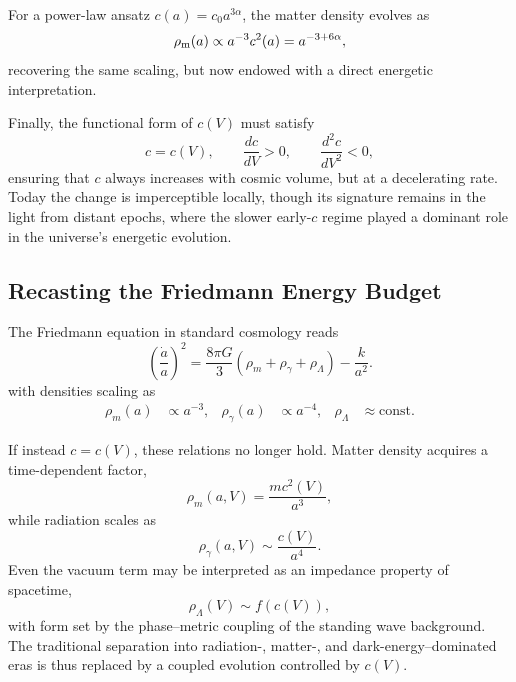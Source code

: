 \documentclass[12pt]{article}
\begin{document}
For a power-law ansatz $c(a) = c_0 a^{3\alpha}$, the matter density evolves as
\begin{equation}
\rho_{\rm m}(a) \propto a^{-3} c^2(a) = a^{-3 + 6\alpha},
\end{equation}
recovering the same scaling, but now endowed with a direct energetic interpretation.

Finally, the functional form of \(c(V)\) must satisfy
\begin{equation}
  c = c(V), \qquad \frac{dc}{dV} > 0, \qquad \frac{d^2c}{dV^2} < 0,
\end{equation}
ensuring that \(c\) always increases with cosmic volume, but at a decelerating rate. Today the change is imperceptible locally, though its signature remains in the light from distant epochs, where the slower early-\(c\) regime played a dominant role in the universe’s energetic evolution.

\subsection{Recasting the Friedmann Energy Budget}

The Friedmann equation in standard cosmology reads
\begin{equation}
\left(\frac{\dot{a}}{a}\right)^{2} = \frac{8 \pi G}{3} \left( \rho_{m} + \rho_{\gamma} + \rho_{\Lambda} \right) - \frac{k}{a^{2}} .
\end{equation}
with densities scaling as
\begin{align}
\rho_{m}(a) &\propto a^{-3}, &
\rho_{\gamma}(a) &\propto a^{-4}, &
\rho_{\Lambda} &\approx \text{const}.
\end{align}

If instead $c = c(V)$, these relations no longer hold. Matter density acquires a time-dependent factor,
\begin{equation}
\rho_{m}(a, V) = \frac{m c^{2}(V)}{a^{3}} ,
\end{equation}
while radiation scales as
\begin{equation}
\rho_{\gamma}(a, V) \sim \frac{c(V)}{a^{4}} .
\end{equation}
Even the vacuum term may be interpreted as an impedance property of spacetime,
\begin{equation}
\rho_{\Lambda}(V) \sim f\!\left(c(V)\right),
\end{equation}
with form set by the phase–metric coupling of the standing wave background. The traditional separation into radiation-, matter-, and dark-energy–dominated eras is thus replaced by a coupled evolution controlled by $c(V)$.
\end{document}
